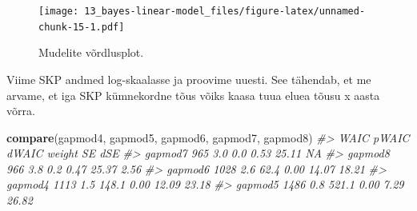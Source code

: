 \documentclass[]{book}
\newenvironment{Shaded}{\begin{snugshade}}{\end{snugshade}}
\newcommand{\CommentTok}[1]{\textcolor[rgb]{0.56,0.35,0.01}{\textit{#1}}}
\newcommand{\DataTypeTok}[1]{\textcolor[rgb]{0.13,0.29,0.53}{#1}}
\newcommand{\DecValTok}[1]{\textcolor[rgb]{0.00,0.00,0.81}{#1}}
\newcommand{\KeywordTok}[1]{\textcolor[rgb]{0.13,0.29,0.53}{\textbf{#1}}}
\newcommand{\NormalTok}[1]{#1}
\newcommand{\OperatorTok}[1]{\textcolor[rgb]{0.81,0.36,0.00}{\textbf{#1}}}
\newcommand{\StringTok}[1]{\textcolor[rgb]{0.31,0.60,0.02}{#1}}
\begin{document}
\begin{figure}
\centering
\texttt{[image: 13\_bayes-linear-model\_files/figure-latex/unnamed-chunk-15-1.pdf]}
\caption{\label{fig:unnamed-chunk-15}Mudelite võrdlusplot.}
\end{figure}

Viime SKP andmed log-skaalasse ja proovime uuesti. See tähendab, et me arvame, et iga SKP kümnekordne tõus võiks kaasa tuua eluea tõusu x aasta võrra.

\begin{Shaded}
\end{Shaded}

\begin{Shaded}
\begin{Highlighting}[]
\KeywordTok{compare}\NormalTok{(gapmod4, gapmod5, gapmod6, gapmod7, gapmod8)}
\CommentTok{#>         WAIC pWAIC dWAIC weight    SE   dSE}
\CommentTok{#> gapmod7  965   3.0   0.0   0.53 25.11    NA}
\CommentTok{#> gapmod8  966   3.8   0.2   0.47 25.37  2.56}
\CommentTok{#> gapmod6 1028   2.6  62.4   0.00 14.07 18.21}
\CommentTok{#> gapmod4 1113   1.5 148.1   0.00 12.09 23.18}
\CommentTok{#> gapmod5 1486   0.8 521.1   0.00  7.29 26.82}
\end{Highlighting}
\end{Shaded}
\end{document}
